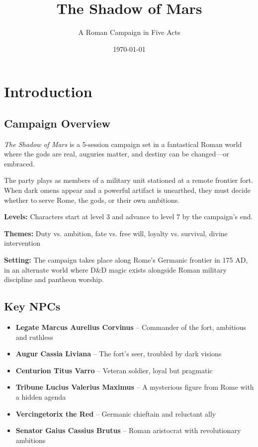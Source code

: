 \documentclass[letterpaper,oneside,twocolumn,openany]{dndbook}
\title{The Shadow of Mars}
\author{A Roman Campaign in Five Acts}
\date{\today}
\begin{document}
\maketitle
\tableofcontents

\chapter{Introduction}

\section{Campaign Overview}

\textit{The Shadow of Mars} is a 5-session campaign set in a fantastical Roman world where the gods are real, auguries matter, and destiny can be changed—or embraced.

The party plays as members of a military unit stationed at a remote frontier fort. When dark omens appear and a powerful artifact is unearthed, they must decide whether to serve Rome, the gods, or their own ambitions.

\textbf{Levels:} Characters start at level 3 and advance to level 7 by the campaign's end.

\textbf{Themes:} Duty vs. ambition, fate vs. free will, loyalty vs. survival, divine intervention

\textbf{Setting:} The campaign takes place along Rome's Germanic frontier in 175 AD, in an alternate world where D\&D magic exists alongside Roman military discipline and pantheon worship.

\section{Key NPCs}

\begin{itemize}
\item \textbf{Legate Marcus Aurelius Corvinus} – Commander of the fort, ambitious and ruthless
\item \textbf{Augur Cassia Liviana} – The fort's seer, troubled by dark visions
\item \textbf{Centurion Titus Varro} – Veteran soldier, loyal but pragmatic
\item \textbf{Tribune Lucius Valerius Maximus} – A mysterious figure from Rome with a hidden agenda
\item \textbf{Vercingetorix the Red} – Germanic chieftain and reluctant ally
\item \textbf{Senator Gaius Cassius Brutus} – Roman aristocrat with revolutionary ambitions
\end{itemize}
\end{document}
